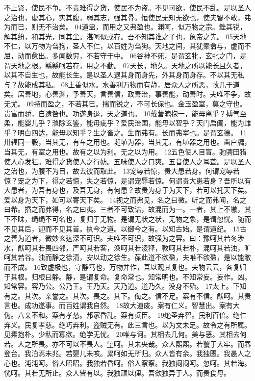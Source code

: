 \documentclass[a5paper,zihao=-4,oneside,UTF8]{ctexart}
\begin{document}
不上贤，使民不争。不贵难得之货，使民不为盗。不见可欲，使民不乱。是以圣人之治也，虚其心，实其腹，弱其志，强其骨。恒使民无知无欲也，使夫智不敢，弗为而已，则无不治矣。
04道盅，而用之又弗盈也。渊呵，似万物之宗。銼其锐，解其纷，和其光，同其尘。湛呵似或存。吾不知其谁之子也，象帝之先。
05天地不仁，以万物为刍狗，圣人不仁，以百姓为刍狗。天地之间，其犹橐龠与，虚而不屈，动而愈出。多闻数穷，不若守于中。
06谷神不死，是谓玄牝，玄牝之门，是谓天地之根。緜緜呵若存，用之不勤。
07天长，地久。天地之所以能长且久者，以其不自生也，故能长生。是以圣人退其身而身先，外其身而身存。不以其无私与？故能成其私。
08上善似水。水善利万物而有静，居众人之所恶，故几于道矣。居善地，心善渊，予善天，言善信，政善治，事善能，动善时。夫唯不争，故无尤。
09持而盈之，不若其已。揣而锐之，不可长保也。金玉盈室，莫之守也。贵富而骄，自遗咎也。功遂身退，天之道也。
10戴营魄抱一，能毋离乎？搏气至柔，能婴儿乎？滌除玄鉴，能毋疵乎？爱民治国，能毋以智乎？天门启阖，能为雌乎？明白四达，能毋以知乎？生之畜之。生而弗有。长而弗宰也。是谓玄德。
11卅辐同一毂，当其无，有车之用也。埏埴为器，当其无，有埴器之用也。凿户牗，当其无，有室之用也。故有之以为利。无之以为用。
12五色使人目盲。驰骋田猎使人心发狂。难得之货使人之行妨。五味使人之口爽。五音使人之耳聋。是以圣人之治也，为腹不为目，故去彼而取此。
13宠辱若惊，贵大患若身。何谓宠辱若惊？宠之为下，得之若惊，失之若惊，是谓宠辱若惊。何谓贵大患若身？吾所以有大患者，为吾有身也，及吾无身，有何患？故贵为身于为天下，若可以托天下矣。爱以身为天下，如可以寄天下矣。
14视之而弗见，名之曰微。听之而弗闻，名之曰希。捪之而弗得，名之曰夷。三者不可致诘，故混而为一。一者，其上不皦，其下不昧，绳绳不可名也，复归于无物。是谓无状之状，无物之象，是谓忽恍。随而不见其后，迎而不见其首。执今之道。以御今之有。以知古始。是谓道纪。
15古之善为道者，微妙玄达深不可识。夫唯不可识，故强为之容。曰：豫呵其若冬涉水，猷呵其若畏四邻，严呵其若客，涣呵其若淩释，敦呵其若朴，混呵其若浊，旷呵其若谷。浊而静之徐清，安以动之徐生。葆此道不欲盈，夫唯不欲盈，是以能敝而不成。
16致虚极也，守静笃也，万物并作，吾以观其复也。夫物云云，各复归于其根。归根曰静。静，是谓复命。复命常也。知常明也。不知常妄。妄作。凶。知常容。容乃公。公乃王。王乃天。天乃道。道乃久。没身不殆。
17太上。下知有之。其次。亲誉之。其次。畏之。其下。侮之。信不足。案有不信。猷呵。其贵言也。成功遂事。而百姓谓我自然。
18故大道废。案有仁义。智慧出。案有大伪。六亲不和。案有孝慈。邦家昏乱。案有贞臣。
19绝圣弃智。民利百倍。绝仁弃义。民复孝慈。绝巧弃利。盗贼无有。此三言也。以为文未足。故令之有所属。见素抱朴。少私而寡欲。绝学无忧。
20唯与诃。其相去几何。美与恶。其相去何若。人之所畏。亦不可以不畏人。望呵。其未央哉。众人熙熙。若饗于大牢。而春登台。我泊焉未兆。若婴儿未咳。累呵如无所归。众人皆有余。我独匮。我愚人之心也。沌沌呵。俗人昭昭。我独若昏呵。俗人察察。我独闷闷呵。忽呵。其若海。恍呵。其若无所止。众人皆有以。我独顽以俚。吾欲独异于人。而贵食母。
\end{document}
